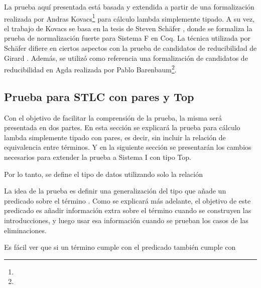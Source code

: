 \vspace{0.5em}
\AgdaSymbol{:}
\AgdaSymbol{\{}
\AgdaSymbol{\}}
\AgdaSymbol{(}
\AgdaSymbol{:}
\AgdaSymbol{)}
\vspace{0.5em}

La prueba aquí presentada está basada y extendida a partir de una formalización realizada por 
Andras Kovacs\footnote{} para cálculo lambda simplemente tipado.
A su vez, el trabajo de Kovacs se basa en la tesis de Steven Schäfer \cite{Schafer}, donde se formaliza la prueba de normalización fuerte para Sistema F en Coq.
La técnica utilizada por Schäfer difiere en ciertos aspectos con la prueba de candidatos de reducibilidad de Girard \cite{Girard}.
Además, se utilizó como referencia una formalización de candidatos de reducibilidad en Agda realizada por Pablo Barenbaum\footnote{}.

\subsection{Prueba para STLC con pares y Top}

Con el objetivo de facilitar la comprensión de la prueba, la misma será presentada en dos partes.
En esta sección se explicará la prueba para cálculo lambda simplemente tipado con pares, es decir, sin incluir la relación de equivalencia entre términos.
Y en la siguiente sección se presentarán los cambios necesarios para extender la prueba a Sistema I con tipo Top.

Por lo tanto, se define el tipo de datos  utilizando solo la relación \type{$\_\hookrightarrow\_$}


La idea de la prueba es definir una generalización del tipo  que añade un predicado sobre el término .
Como se explicará más adelante, el objetivo de este predicado es añadir información extra sobre el término cuando se construyen las introducciones, y luego usar esa información cuando se prueban los casos de las eliminaciones.


Es fácil ver que si un término cumple con el predicado  también cumple con 



